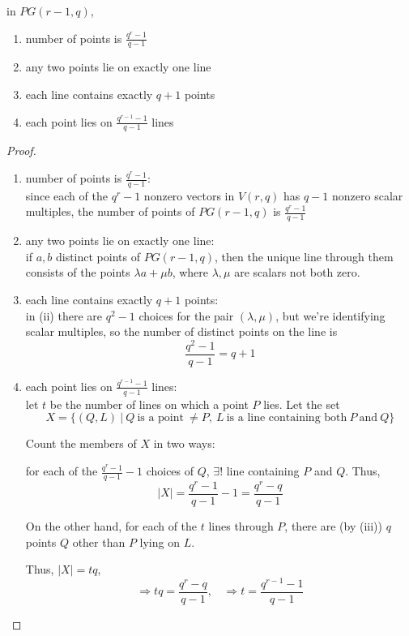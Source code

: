 \documentclass{article}
\theoremstyle{definition}
\newenvironment{lemma}[1]
{\renewcommand\theinnerlemma{#1}\innerlemma}
{\endinnerlemma}
\begin{document}
\begin{lemma}{14.6}
  in $PG(r-1,q)$,
  \begin{enumerate}
    \item number of points is $\frac{q^r-1}{q-1}$
    \item any two points lie on exactly one line
    \item each line contains exactly $q+1$ points
    \item each point lies on $\frac{q^{r-1} -1}{q-1}$ lines
  \end{enumerate}
\end{lemma}
\begin{proof}
  \begin{enumerate}
    \item number of points is $\frac{q^r-1}{q-1}$:\\
      since each of the $q^r-1$ nonzero vectors in $V(r,q)$ has $q-1$ nonzero scalar multiples, the number of points of $PG(r-1,q)$ is $\frac{q^r-1}{q-1}$

    \item any two points lie on exactly one line:\\
      if $a,b$ distinct points of $PG(r-1,q)$, then the unique line through them consists of the points $\lambda a + \mu b$, where $\lambda,\mu$ are scalars not both zero.

    \item each line contains exactly $q+1$ points:\\
      in (ii) there are $q^2-1$ choices for the pair $(\lambda, \mu)$, but we're identifying scalar multiples, so the number of distinct points on the line is
      $$\frac{q^2 -1}{q-1}=q+1$$

    \item each point lies on $\frac{q^{r-1} -1}{q-1}$ lines:\\
      let $t$ be the number of lines on which a point $P$ lies. Let the set
      $$X=\{(Q,L) ~|~ Q ~\text{is a point}~ \neq P,~ L~\text{is a line containing both}~ P ~\text{and}~ Q \}$$

      Count the members of $X$ in two ways:

      for each of the $\frac{q^r -1}{q-1} -1$ choices of $Q$, $\exists !$ line containing $P$ and $Q$. Thus,
      $$|X|=\frac{q^r-1}{q-1} -1 = \frac{q^r-q}{q-1}$$

      On the other hand, for each of the $t$ lines through $P$, there are (by (iii)) $q$ points $Q$ other than $P$ lying on $L$.

      Thus, $|X|=tq$,
      $$\Longrightarrow tq = \frac{q^r-q}{q-1}, ~~~~ \Longrightarrow t=\frac{q^{r-1}-1}{q-1}$$
  \end{enumerate}
\end{proof}
\end{document}
